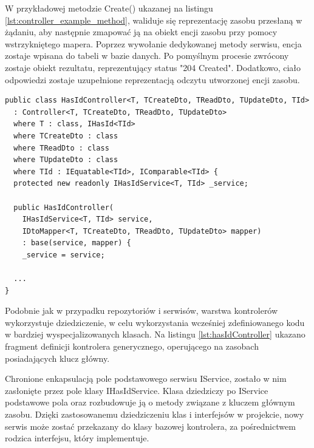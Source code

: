 W przykładowej metodzie Create() ukazanej na listingu \ref{lst:controller_example_method}, waliduje się reprezentację zasobu przesłaną w żądaniu, aby następnie zmapować ją na obiekt encji zasobu przy pomocy wstrzykniętego mapera. Poprzez wywołanie dedykowanej metody serwisu, encja zostaje wpisana do tabeli w bazie danych. Po pomyślnym procesie zwrócony zostaje obiekt rezultatu, reprezentujący status "204 Created". Dodatkowo, ciało odpowiedzi zostaje uzupełnione reprezentacją odczytu utworzonej encji zasobu. 

\begin{lstlisting}[language=CSharp, caption={Generyczna klasa kontrolera zasobów posiadających klucz główny}, label=lst:hasIdController]
public class HasIdController<T, TCreateDto, TReadDto, TUpdateDto, TId>
  : Controller<T, TCreateDto, TReadDto, TUpdateDto>
  where T : class, IHasId<TId>
  where TCreateDto : class
  where TReadDto : class
  where TUpdateDto : class
  where TId : IEquatable<TId>, IComparable<TId> {
  protected new readonly IHasIdService<T, TId> _service;

  public HasIdController(
    IHasIdService<T, TId> service,
    IDtoMapper<T, TCreateDto, TReadDto, TUpdateDto> mapper)
    : base(service, mapper) {
    _service = service;
    
  ...
}
\end{lstlisting}

Podobnie jak w przypadku repozytoriów i serwisów, warstwa kontrolerów wykorzystuje dziedziczenie, w celu wykorzystania wcześniej zdefiniowanego kodu w bardziej wyspecjalizowanych klasach. Na listingu \ref{lst:hasIdController} ukazano fragment definicji kontrolera generycznego, operującego na zasobach posiadających klucz główny. 

Chronione enkapsulacją pole podstawowego serwisu IService, zostało w nim zasłonięte przez pole klasy IHasIdService. Klasa dziedziczy po IService podstawowe pola oraz rozbudowuje ją o metody związane z kluczem głównym zasobu. Dzięki zastosowanemu dziedziczeniu klas i interfejsów w projekcie, nowy serwis może zostać przekazany do klasy bazowej kontrolera, za pośrednictwem rodzica interfejsu, który implementuje.

